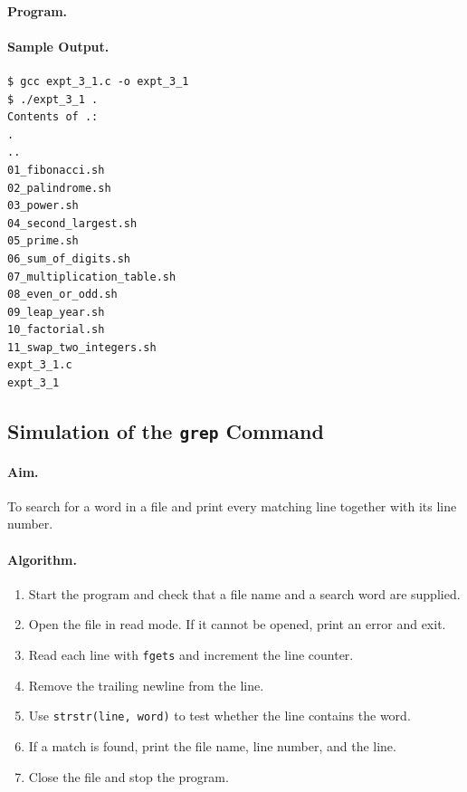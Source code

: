 \paragraph{Program.}


\paragraph{Sample Output.}
\begin{lstlisting}[style=outputstyle, caption={Listing a directory with the simulated \texttt{ls}}]
$ gcc expt_3_1.c -o expt_3_1
$ ./expt_3_1 .
Contents of .:
.
..
01_fibonacci.sh
02_palindrome.sh
03_power.sh
04_second_largest.sh
05_prime.sh
06_sum_of_digits.sh
07_multiplication_table.sh
08_even_or_odd.sh
09_leap_year.sh
10_factorial.sh
11_swap_two_integers.sh
expt_3_1.c
expt_3_1
\end{lstlisting}

\subsection{Simulation of the \texttt{grep} Command}

\paragraph{Aim.}
To search for a word in a file and print every matching line together with its line number.

\paragraph{Algorithm.}
\begin{enumerate}
    \item Start the program and check that a file name and a search word are supplied.
    \item Open the file in read mode. If it cannot be opened, print an error and exit.
    \item Read each line with \texttt{fgets} and increment the line counter.
    \item Remove the trailing newline from the line.
    \item Use \texttt{strstr(line, word)} to test whether the line contains the word.
    \item If a match is found, print the file name, line number, and the line.
    \item Close the file and stop the program.
\end{enumerate}

